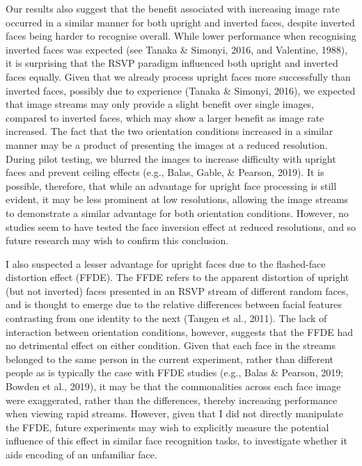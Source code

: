 \documentclass[
  english,
  man]{apa6}
\begin{document}
Our results also suggest that the benefit associated with increasing image rate occurred in a similar manner for both upright and inverted faces, despite inverted faces being harder to recognise overall. While lower performance when recognising inverted faces was expected (see Tanaka \& Simonyi, 2016, and Valentine, 1988), it is surprising that the RSVP paradigm influenced both upright and inverted faces equally. Given that we already process upright faces more successfully than inverted faces, possibly due to experience (Tanaka \& Simonyi, 2016), we expected that image streams may only provide a slight benefit over single images, compared to inverted faces, which may show a larger benefit as image rate increased. The fact that the two orientation conditions increased in a similar manner may be a product of presenting the images at a reduced resolution. During pilot testing, we blurred the images to increase difficulty with upright faces and prevent ceiling effects (e.g., Balas, Gable, \& Pearson, 2019). It is possible, therefore, that while an advantage for upright face processing is still evident, it may be less prominent at low resolutions, allowing the image streams to demonstrate a similar advantage for both orientation conditions. However, no studies seem to have tested the face inversion effect at reduced resolutions, and so future research may wish to confirm this conclusion.

I also suspected a lesser advantage for upright faces due to the flashed-face distortion effect (FFDE). The FFDE refers to the apparent distortion of upright (but not inverted) faces presented in an RSVP stream of different random faces, and is thought to emerge due to the relative differences between facial features contrasting from one identity to the next (Tangen et al., 2011). The lack of interaction between orientation conditions, however, suggests that the FFDE had no detrimental effect on either condition. Given that each face in the streams belonged to the same person in the current experiment, rather than different people as is typically the case with FFDE studies (e.g., Balas \& Pearson, 2019; Bowden et al., 2019), it may be that the commonalities across each face image were exaggerated, rather than the differences, thereby increasing performance when viewing rapid streams. However, given that I did not directly manipulate the FFDE, future experiments may wish to explicitly measure the potential influence of this effect in similar face recognition tasks, to investigate whether it aids encoding of an unfamiliar face.
\end{document}
